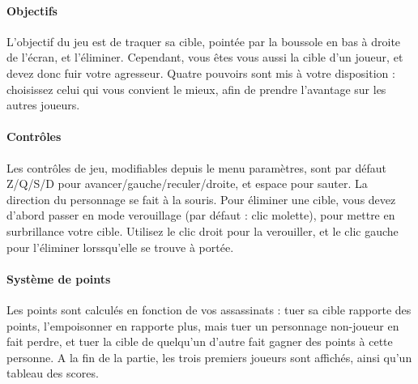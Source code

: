 \paragraph{Objectifs}

    L'objectif du jeu est de traquer sa cible, pointée par la boussole en bas à droite de l'écran, et l'éliminer. Cependant, 
    vous êtes vous aussi la cible d'un joueur, et devez donc fuir votre agresseur. Quatre pouvoirs sont mis à votre disposition : 
    choisissez celui qui vous convient le mieux, afin de prendre l'avantage sur les autres joueurs.
    

\paragraph{Contrôles}

    Les contrôles de jeu, modifiables depuis le menu paramètres, sont par défaut Z/Q/S/D pour 
    avancer/gauche/reculer/droite, et espace pour sauter. La direction du personnage se fait à la souris. 
    Pour éliminer une cible, vous devez d'abord passer en mode verouillage (par défaut : clic molette), pour mettre en surbrillance 
    votre cible. Utilisez le clic droit pour la verouiller, et le clic gauche pour l'éliminer lorssqu'elle se trouve à portée.


\paragraph{Système de points}

    Les points sont calculés en fonction de vos assassinats : tuer sa cible rapporte des points, l'empoisonner en rapporte plus, 
    mais tuer un personnage non-joueur en fait perdre, et tuer la cible de quelqu'un d'autre fait gagner des points à cette personne. 
    A la fin de la partie, les trois premiers joueurs sont affichés, ainsi qu'un tableau des scores.
    
